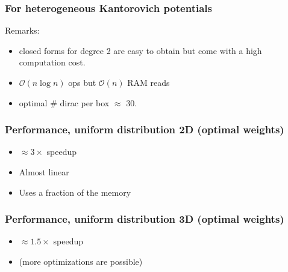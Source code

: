 \documentclass[aspectratio=169]{beamer}
\begin{document}
\begin{frame}
    \frametitle{For heterogeneous Kantorovich potentials}

    Remarks:
    \begin{itemize}
        \item closed forms for degree 2 are easy to obtain but come with a high computation cost.
        \item $\mathcal{O}( n \log{} n )$ ops but $\mathcal{O}( n )$ RAM reads
        \item optimal $\#$ dirac per box $\approx$ 30.
    \end{itemize}
\end{frame}


\begin{frame}
    \frametitle{Performance, uniform distribution 2D (optimal weights)}

    \begin{minipage}[c][0.6\textheight][c]{0.55\textwidth}
        
    \end{minipage}
    \begin{minipage}[c][0.6\textheight][c]{0.4\textwidth}
        \begin{itemize}
            \item $\approx 3 \times$ speedup

            \bigskip
            \item Almost linear

            \bigskip
            \item Uses a fraction of the memory
        \end{itemize}
    \end{minipage}
\end{frame}

\begin{frame}
    \frametitle{Performance, uniform distribution 3D (optimal weights)}

    \begin{minipage}[c][0.6\textheight][c]{0.55\textwidth}
        
    \end{minipage}
    \begin{minipage}[c][0.6\textheight][c]{0.4\textwidth}
        \begin{itemize}
            \item $\approx 1.5 \times$ speedup
            
            \bigskip{}
            \item (more optimizations are possible)
        \end{itemize}
    \end{minipage}
\end{frame}
\end{document}
